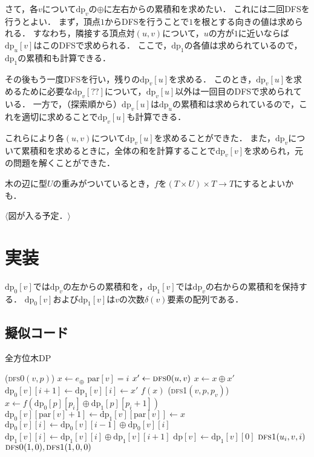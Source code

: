 \documentclass{jsarticle}
\newcommand{\DP}{\mathrm{dp}}
\begin{document}
さて，各$v$について$\DP_v$の$\oplus$に左右からの累積和を求めたい．
これには二回DFSを行うとよい．
まず，頂点$1$からDFSを行うことで$1$を根とする向きの値は求められる．
すなわち，隣接する頂点対$(u, v)$について，$u$の方が$1$に近いならば$\DP_u[v]$はこのDFSで求められる．
ここで，$\DP_1$の各値は求められているので，$\DP_1$の累積和も計算できる．

その後もう一度DFSを行い，残りの$\DP_v[u]$を求める．
このとき，$\DP_v[u]$を求めるために必要な$\DP_v[??]$について，$\DP_v[u]$以外は一回目のDFSで求められている．
一方で，（探索順から）$\DP_v[u]$は$\DP_u$の累積和は求められているので，これを適切に求めることで$\DP_v[u]$も計算できる．

これらにより各$(u, v)$について$\DP_v[u]$を求めることができた．
また，$\DP_v$について累積和を求めるときに，全体の和を計算することで$\DP_v[v]$を求められ，元の問題を解くことができた．

木の辺に型$U$の重みがついているとき，$f$を$(T\times U)\times T\to T$にするとよいかも．

\vspace{10ex}
\begin{center}
  $\langle$図が入る予定．$\rangle$
\end{center}
\vspace{10ex}

\clearpage
\section{実装}

$\DP_0[v]$では$\DP_v$の左からの累積和を，$\DP_1[v]$では$\DP_v$の右からの累積和を保持する．
$\DP_0[v]$および$\DP_1[v]$は$v$の次数$\delta(v)$要素の配列である．

\subsection{擬似コード}
\begin{alg}
  \caption{全方位木DP}
  \newcommand{\PAR}{\mathrm{par}}
  \Function(\textsc{dfs0}{$(v, p)$})
  {
    {$x \gets e_\oplus$}\;
    {
      {
        {$\PAR[v] = i$}
        \Continue
      }
      {$x' \gets \text{\textsc{dfs0}}(u, v)$}\;
      {$x \gets x \oplus x'$}\;
      {$\DP_0[v][i+1] \gets \DP_1[v][i] \gets x'$}\;
    }
    \Return $f(x)$\;
  }
  \Function(\textsc{dfs1}{$(v, p, p_v)$})
  {
    {
      {$x \gets f(\DP_0[p][p_i] \oplus \DP_1[p][p_i+1])$}\;
      {$\DP_0[v][\PAR[v]+1] \gets \DP_1[v][\PAR[v]] \gets x$}\;
    }
      {$\DP_0[v][i] \gets \DP_0[v][i-1] \oplus \DP_0[v][i]$}
      {$\DP_1[v][i] \gets \DP_1[v][i] \oplus \DP_1[v][i+1]$}
    {$\DP[v] \gets \DP_1[v][0]$}\;
    {
       {$\text{\textsc{dfs1}}(u_i, v, i)$}
    }
  }
  {$\text{\textsc{dfs0}}(1, 0), \text{\textsc{dfs1}}(1, 0, 0)$}\;
\end{alg}
\end{document}
